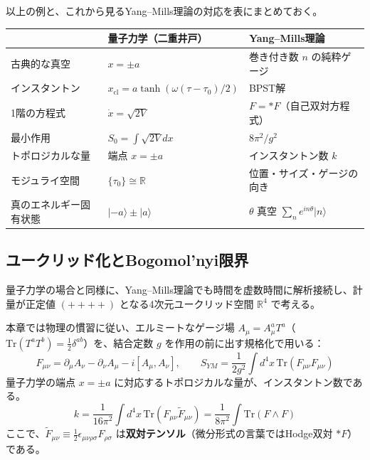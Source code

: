 \documentclass[uplatex, dvipdfmx, book]{jsbook}
\let\origsubsection\subsection
\let\origsubsubsection\subsubsection
\renewcommand{\section}{\origsubsection}
\renewcommand{\subsection}{\origsubsubsection}
\renewcommand{\subsubsection}{\paragraph}
\begin{document}
以上の例と、これから見るYang--Mills理論の対応を表にまとめておく。

\begin{center}
\begin{tabular}{lll}
    \hline
     & 量子力学（二重井戸） & Yang--Mills理論 \\
    \hline
    古典的な真空 & $x = \pm a$ & 巻き付き数 $n$ の純粋ゲージ \\
    インスタントン & $x_{\text{cl}} = a\tanh(\omega(\tau-\tau_0)/2)$ & BPST解 \\
    1階の方程式 & $\dot{x} = \sqrt{2V}$ & $F = *F$（自己双対方程式） \\
    最小作用 & $S_0 = \int\sqrt{2V}dx$ & $8\pi^2/g^2$ \\
    トポロジカルな量 & 端点 $x = \pm a$ & インスタントン数 $k$ \\
    モジュライ空間 & $\{\tau_0\} \cong \mathbb{R}$ & 位置・サイズ・ゲージの向き \\
    真のエネルギー固有状態 & $|{-a}\rangle \pm |a\rangle$ & $\theta$ 真空 $\sum_n e^{in\theta}|n\rangle$ \\
    \hline
\end{tabular}
\end{center}

\section{ユークリッド化とBogomol'nyi限界}
\label{sec:bogomolnyi}

量子力学の場合と同様に、Yang--Mills理論でも時間を虚数時間に解析接続し、計量が正定値 $(++++)$ となる4次元ユークリッド空間 $\mathbb{R}^4$ で考える。

本章では物理の慣習に従い、エルミートなゲージ場 $A_\mu = A_\mu^a T^a$（$\mathrm{Tr}(T^a T^b) = \frac{1}{2}\delta^{ab}$）を、結合定数 $g$ を作用の前に出す規格化で用いる：
\begin{equation}
    F_{\mu\nu} = \partial_\mu A_\nu - \partial_\nu A_\mu - i[A_\mu, A_\nu], \qquad
    S_{YM} = \frac{1}{2g^2} \int d^4x \, \mathrm{Tr}(F_{\mu\nu} F_{\mu\nu})
\end{equation}
量子力学の端点 $x = \pm a$ に対応するトポロジカルな量が、インスタントン数である。
\begin{equation}
    k = \frac{1}{16\pi^2} \int d^4x \, \mathrm{Tr}(F_{\mu\nu} \tilde{F}_{\mu\nu}) = \frac{1}{8\pi^2} \int \mathrm{Tr}(F \wedge F)
    \label{eq:instanton-number-ch5}
\end{equation}
ここで、$\tilde{F}_{\mu\nu} \equiv \frac{1}{2}\epsilon_{\mu\nu\rho\sigma}F_{\rho\sigma}$ は\textbf{双対テンソル}（微分形式の言葉ではHodge双対 $*F$）である。
\end{document}
